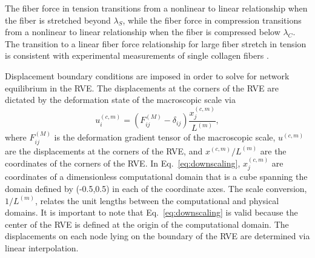 \documentclass[]{interact}
\begin{document}
The fiber force in tension transitions from a nonlinear to linear relationship when the fiber is stretched beyond $\lambda_S$, while the fiber force in compression transitions from a nonlinear to linear relationship when the fiber is compressed below $\lambda_C$. The transition to a linear fiber force relationship for large fiber stretch in tension is consistent with experimental measurements of single collagen fibers \citep{Eppell:2006hh,Svensson:2010fr}. 

Displacement boundary conditions are imposed in order to solve for network equilibrium in the RVE. The displacements at the corners of the RVE are dictated by the deformation state of the macroscopic scale via
%
\begin{equation}
u^{(c,m)}_i = (F^{(M)}_{ij} - \delta_{ij}) \frac{x^{(c,m)}_j}{L^{(m)}},
\label{eq:downscaling}
\end{equation}
%
where $F^{(M)}_{ij}$ is the deformation gradient tensor of the macroscopic scale, $u^{(c,m)}$ are the displacements at the corners of the RVE,  and $x^{(c,m)}/L^{(m)}$ are the coordinates of the corners of the RVE. In Eq.\ \eqref{eq:downscaling}, $x^{(c,m)}_j$ are coordinates of a dimensionless computational domain that is a cube spanning the domain defined by (-0.5,0.5) in each of the coordinate axes. The scale conversion, $1/L^{(m)}$, relates the unit lengths between the computational and physical domains. It is important to note that Eq.\ \eqref{eq:downscaling} is valid because the center of the RVE is defined at the origin of the computational domain. The displacements on each node lying on the boundary of the RVE are determined via linear interpolation. 
\end{document}
